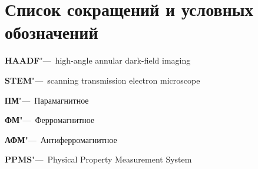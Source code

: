 \chapter*{Список сокращений и условных обозначений}             %



\textbf{HAADF}"---~high-angle annular dark-field imaging

\textbf{STEM}"---~scanning transmission electron microscope

\textbf{ПМ}"---~Парамагнитное

\textbf{ФМ}"---~Ферромагнитное

\textbf{АФМ}"---~Антиферромагнитное

\textbf{PPMS}"---~Physical Property Measurement System 

